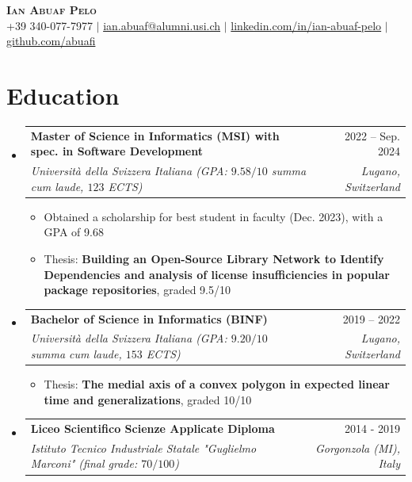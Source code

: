 \documentclass[letterpaper,11pt]{article}
\makeatletter
\newcommand{\resumeItem}[1]{
  \item\small{
    {#1 \vspace{-2pt}}
  }
}
\newcommand{\resumeSubheading}[4]{
  \vspace{-2pt}\item
    \begin{tabular*}{0.97\textwidth}[t]{l@{\extracolsep{\fill}}r}
      \textbf{#1} & #2 \\
      \textit{\small#3} & \textit{\small #4} \\
    \end{tabular*}\vspace{-7pt}
}
\newcommand{\resumeSubHeadingListStart}{\begin{itemize}[leftmargin=0.15in, label={}]}
\newcommand{\resumeSubHeadingListEnd}{\end{itemize}}
\newcommand{\resumeItemListStart}{\begin{itemize}}
\newcommand{\resumeItemListEnd}{\end{itemize}\vspace{-5pt}}
\makeatother
\begin{document}

\begin{center}
    \textbf{\Huge \scshape Ian Abuaf Pelo} \\ \vspace{1pt}
    \small +39 340-077-7977 $|$ \href{mailto:ian.abuaf@alumni.usi.ch}{ian.abuaf@alumni.usi.ch} $|$ 
    \href{https://www.linkedin.com/in/ian-abuaf-pelo}{linkedin.com/in/ian-abuaf-pelo} $|$
    \href{https://github.com/abuafi}{github.com/abuafi}
\end{center}


\section{Education}
\resumeSubHeadingListStart

  \resumeSubheading
  {Master of Science in Informatics (MSI) with spec. in Software Development}
  {2022 -- Sep. 2024}
  {Università della Svizzera Italiana (GPA: $9.58/10$ summa cum laude, $123$ ECTS)}
  {Lugano, Switzerland}
  \resumeItemListStart
    \resumeItem{Obtained a scholarship for best student in faculty (Dec. 2023), with a GPA of 9.68}
    \resumeItem{Thesis: \textbf{Building an Open-Source Library Network to Identify Dependencies and analysis of
    license insufficiencies in popular package repositories}, graded 9.5/10}
  \resumeItemListEnd

  \resumeSubheading
  {Bachelor of Science in Informatics (BINF) }
  {2019 -- 2022}
  {Università della Svizzera Italiana (GPA: $9.20/10$ summa cum laude, $153$ ECTS)}
  {Lugano, Switzerland}
  \resumeItemListStart
  \resumeItem{Thesis: \textbf{The medial axis of a convex polygon in expected linear time and generalizations}, graded 10/10}
\resumeItemListEnd

\resumeSubheading
  {Liceo Scientifico Scienze Applicate Diploma}
  {2014 - 2019}
  {Istituto Tecnico Industriale Statale "Guglielmo Marconi" (final grade: $70/100$)}
  {Gorgonzola (MI), Italy}
 
\resumeSubHeadingListEnd
\end{document}
